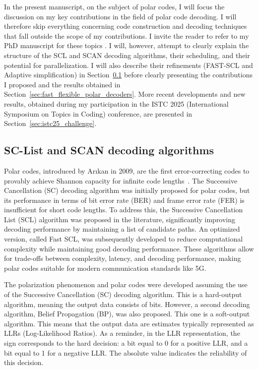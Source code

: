 \documentclass[11pt]{report}
\begin{document}
In the present manuscript, on the subject of polar codes, I will focus the discussion on my key contributions in the field of polar code decoding. I will therefore skip everything concerning code construction and decoding techniques that fall outside the scope of my contributions. I invite the reader to refer to my PhD manuscript for these topics \cite{leonardon:tel-01997553}. I will, however, attempt to clearly explain the structure of the SCL and SCAN decoding algorithms, their scheduling, and their potential for parallelization. I will also describe their refinements (FAST-SCL and Adaptive simplification) in Section~\ref{sec:sc_list_scan} before clearly presenting the contributions I proposed and the results obtained in Section~\ref{sec:fast_flexible_polar_decoders}. More recent developments and new results, obtained during my participation in the ISTC 2025 (International Symposium on Topics in Coding) conference, are presented in Section~\ref{sec:istc25_challenge}.

\subsection{SC-List and SCAN decoding algorithms}
\label{sec:sc_list_scan}

Polar codes, introduced by Arıkan in 2009, are the first error-correcting codes to provably achieve Shannon capacity for infinite code lengths~\cite{Arikan2009}. The Successive Cancellation (SC) decoding algorithm was initially proposed for polar codes, but its performance in terms of bit error rate (BER) and frame error rate (FER) is insufficient for short code lengths. To address this, the Successive Cancellation List (SCL) algorithm was proposed in the literature, significantly improving decoding performance by maintaining a list of candidate paths. An optimized version, called Fast SCL, was subsequently developed to reduce computational complexity while maintaining good decoding performance. These algorithms allow for trade-offs between complexity, latency, and decoding performance, making polar codes suitable for modern communication standards like 5G.

The polarization phenomenon and polar codes were developed assuming the use of the Successive Cancellation (SC) decoding algorithm. This is a hard-output algorithm, meaning the output data consists of bits. However, a second decoding algorithm, Belief Propagation (BP), was also proposed. This one is a soft-output algorithm. This means that the output data are estimates typically represented as LLRs (Log-Likelihood Ratios). As a reminder, in the LLR representation, the sign corresponds to the hard decision: a bit equal to 0 for a positive LLR, and a bit equal to 1 for a negative LLR. The absolute value indicates the reliability of this decision.
\end{document}
